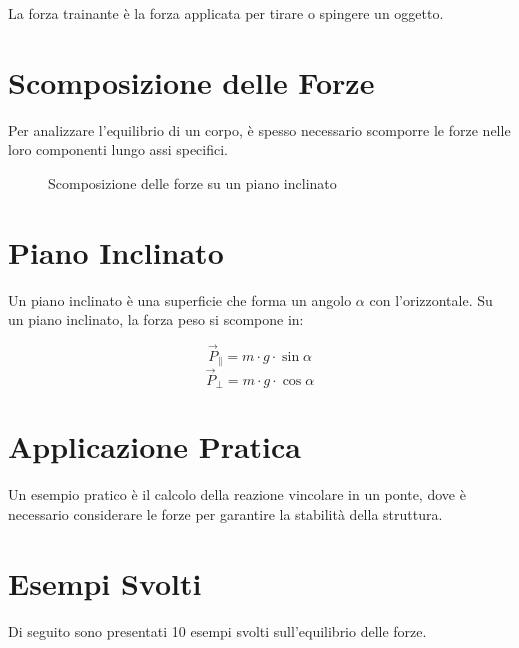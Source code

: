 \documentclass[a4paper,12pt]{article}
\begin{document}
La forza trainante è la forza applicata per tirare o spingere un oggetto.

\section{Scomposizione delle Forze}

Per analizzare l'equilibrio di un corpo, è spesso necessario scomporre le forze nelle loro componenti lungo assi specifici.

\begin{figure}[h]
    \centering
    \caption{Scomposizione delle forze su un piano inclinato}
\end{figure}

\section{Piano Inclinato}

Un piano inclinato è una superficie che forma un angolo $\alpha$ con l'orizzontale. Su un piano inclinato, la forza peso si scompone in:

\[
\vec{P}_\parallel = m \cdot g \cdot \sin{\alpha}
\]
\[
\vec{P}_\perp = m \cdot g \cdot \cos{\alpha}
\]

\section{Applicazione Pratica}

Un esempio pratico è il calcolo della reazione vincolare in un ponte, dove è necessario considerare le forze per garantire la stabilità della struttura.

\section{Esempi Svolti}

Di seguito sono presentati 10 esempi svolti sull'equilibrio delle forze.
\end{document}

